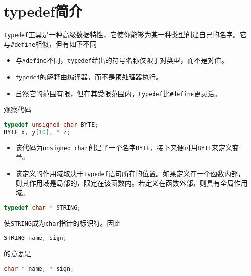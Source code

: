 \section{typedef简介}

\begin{frame}[fragile]\ft{\secname}
\verb|typedef|工具是一种高级数据特性，它使你能够为某一种类型创建自己的名字。它与\verb|#define|相似，但有如下不同
\begin{itemize}
\item 与\verb|#define|不同，\verb|typedef|给出的符号名称仅限于对类型，而不是对值。\\[0.1in]
\item \verb|typedef|的解释由编译器，而不是预处理器执行。\\[0.1in]
\item 虽然它的范围有限，但在其受限范围内，\verb|typedef|比\verb|#define|更灵活。
\end{itemize}
\end{frame}

\begin{frame}[fragile]\ft{\secname}
观察代码
  \begin{lstlisting}[language=c,backgroundcolor=\color{red!20}]
typedef unsigned char BYTE;
BYTE x, y[10], * z;
  \end{lstlisting}
  \begin{itemize}
  \item 该代码为\verb|unsigned char|创建了一个名字\verb|BYTE|，接下来便可用\verb|BYTE|来定义变量。
  \item 该定义的作用域取决于\verb|typedef|语句所在的位置。如果定义在一个函数内部，则其作用域是局部的，限定在该函数内。若定义在函数外部，则具有全局作用域。
  \end{itemize}
\end{frame}

\begin{frame}[fragile]\ft{\secname}
  \begin{lstlisting}[language=c,backgroundcolor=\color{red!20}]
typedef char * STRING;
  \end{lstlisting}
使\verb|STRING|成为\verb|char|指针的标识符。因此
  \begin{lstlisting}[language=c,backgroundcolor=\color{red!20}]
STRING name, sign;
  \end{lstlisting}
的意思是
  \begin{lstlisting}[language=c,backgroundcolor=\color{red!20}]
char * name, * sign;
  \end{lstlisting} 
\end{frame}

